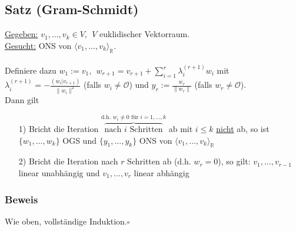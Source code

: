 \documentclass[12pt,titlepage, pdf]{article}
\newcommand{\R}{\mathds{R}}
\newcommand{\uline}[1]{\underline{#1}}
\newcommand{\vecspace}[2]{\langle#1\rangle_{#2}}
\newcommand{\vecspaceR}[1]{\vecspace{#1}{\R}}
\newcommand{\qed}{\hfill$\square$}
\renewcommand{\>}{\rightarrow}
\renewcommand{\*}{\cdot}
\begin{document}
\subsection{Satz (Gram-Schmidt)}
\uline{Gegeben:} $v_1,...,v_k \in V, ~~V$ euklidischer Vektorraum. \\
\uline{Gesucht:} ONS von $\vecspaceR{v_1,...,v_k}$. \\
\\
Definiere dazu $w_1 := v_1,~~ w_{r+1} = v_{r+1} + \sum_{i = 1}^{r} \lambda_i^{(r+1)} w_i$ mit $\lambda_i^{(r+1)} = -\frac{(w_i|v_{r+1})}{\|w_i\|^2}$ (falls $w_i \neq \mathcal{O}$) und $y_r := \frac{w_r}{\|w_r\|}$ (falls $w_r \neq \mathcal{O}$).\\
Dann gilt
\begin{itemize}
	\item[1)] Bricht die Iteration $\overbrace{\text{nach } i \text{ Schritten}}^{\text{d.h. } w_i \neq 0 \text{ für } i = 1,...,k}$ ab mit $i \leq k$ \underline{nicht} ab, so ist $\{w_1,...,w_k\}$ OGS und $\{y_1,...,y_k\}$ ONS von $\vecspaceR{v_1,...,v_k}$
	\item[2)] Bricht die Iteration nach $r$ Schritten ab (d.h. $w_r = 0$), so gilt: $v_1,...,v_{r-1}$ linear unabhängig und $v_1,...,v_r$ linear abhängig
\end{itemize}
\subsubsection*{Beweis}
Wie oben, vollständige Induktion.\qed 
\end{document}
